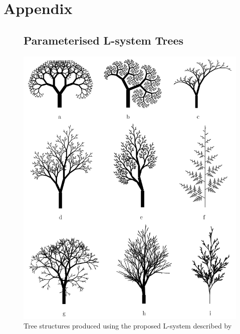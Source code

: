 \documentclass[final]{cmpreport}
\begin{document}
\section{Appendix}
\appendix{}
\begin{figure}[ht]
    \subsection{Parameterised L-system Trees}
    \label{app:parameterised-lsystem-trees}
    \includegraphics[scale=0.6]{tree-lsystem-results.PNG} 
    \centering
    \captionsetup{justification=centering}
    \caption{Tree structures produced using the proposed L-system described by \cite{prusinkiewicz1996systems}}
    \label{fig:tree-lsystem-results}
\end{figure}
\end{document}
